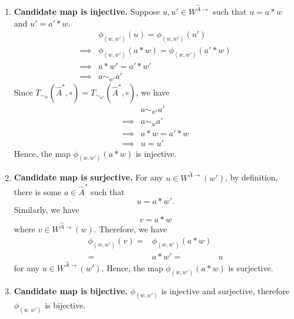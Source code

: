 \begin{proofE}
\begin{enumerate}[(1)]
\begin{enumerate}
        \item \textbf{Candidate map is injective.}
        Suppose $u, u' \in W^{\hat{A}\to}$ such that $u = a \ast w$ and $u' = a' \ast w$.
        \begin{align}
            & \phi_{(w, w')}(u) = \phi_{(w, w')}(u') \\
            \implies & \phi_{(w, w')}(a \ast w) = \phi_{(w, w')}(a' \ast w) \\
            \implies & a \ast w' = a' \ast w' \\
            \implies & a \sim_{w'} a'
        \end{align}
        Since $T_{\sim_{w}}(\hat{A}^{*}, \circ) = T_{\sim_{w'}}(\hat{A}^{*}, \circ)$, we have
        \begin{align}
            & a \sim_{w'} a' \\
            \implies & a \sim_{w} a' \\
            \implies & a \ast w = a' \ast w \\
            \implies & u = u'
        \end{align}
        Hence, the map $\phi_{(w, w')}(a \ast w)$ is injective.

        \item \textbf{Candidate map is surjective.}
        For any $u \in W^{\hat{A}\to}(w')$, by definition, there is some $a \in \hat{A}^{*}$ such that
        \begin{equation}
            u = a \ast w'.
        \end{equation}
        Similarly, we have
        \begin{equation}
            v = a \ast w
        \end{equation}
        where $v \in W^{\hat{A}\to}(w)$.
        Therefore, we have
        \begin{align}
            \phi_{(w, w')}(v) = & \phi_{(w, w')}(a \ast w) \\
            = & a \ast w'
            = & u
        \end{align}
        for any $u \in W^{\hat{A}\to}(w')$.
        Hence, the map $\phi_{(w, w')}(a \ast w)$ is surjective.

        \item \textbf{Candidate map is bijective.}
        $\phi_{(w, w')}$ is injective and surjective, therefore $\phi_{(w, w')}$ is bijective.


\end{enumerate}
\end{enumerate}
\end{proofE}
